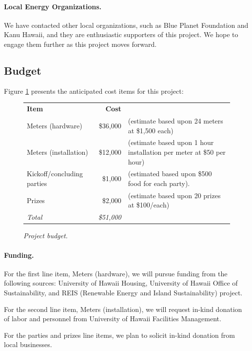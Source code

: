 \documentclass[11pt]{article}
\begin{document}
\paragraph{Local Energy Organizations.}  We have contacted other local
organizations, such as Blue Planet Foundation and Kanu Hawaii, and they are
enthusiastic supporters of this project.  We hope to engage them further as
this project moves forward.


\subsection{Budget}
\label{sec:budget}

Figure \ref{fig:budget} presents the anticipated cost items for this project:

\begin{figure}[!ht]
\small
\begin{tabular}{lrl} \hline
{\bf Item }              & {\bf Cost }  & \\ 
Meters (hardware) & \$36,000 & (estimate based upon 24 meters at \$1,500 each) \\
Meters (installation) & \$12,000 & (estimate based upon 1 hour installation per meter at \$50 per hour) \\
Kickoff/concluding parties & \$1,000 & (estimated based upon \$500 food for each party). \\ 
Prizes                       & \$2,000  & (estimate based upon 20 prizes at \$100/each) \\ \hline 
{\em Total}              &  {\em \$51,000} & \\ \hline      
\end{tabular} 
\normalsize
\caption{{\em Project budget.}}
\label{fig:budget}
\end{figure}

\paragraph{Funding.}  For the first line item, Meters (hardware), we will
pursue funding from the following sources: University of Hawaii Housing,
University of Hawaii Office of Sustainability, and REIS (Renewable Energy
and Island Sustainability) project.

For the second line item, Meters (installation), we will request in-kind donation 
of labor and personnel from  University of Hawaii Facilities Management.

For the parties and prizes line items, we plan to solicit in-kind donation from
local businesses.
\end{document}
